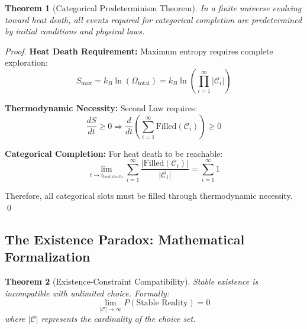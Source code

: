 \documentclass[12pt,a4paper]{article}
\newtheorem{theorem}{Theorem}[section]
\begin{document}
\begin{theorem}[Categorical Predeterminism Theorem]
In a finite universe evolving toward heat death, all events required for categorical completion are predetermined by initial conditions and physical laws.
\end{theorem}

\begin{proof}
\textbf{Heat Death Requirement:}
Maximum entropy requires complete exploration:
\begin{equation}
S_{\text{max}} = k_B \ln(\Omega_{\text{total}}) = k_B \ln\left(\prod_{i=1}^{\infty} |\mathcal{C}_i|\right)
\end{equation}

\textbf{Thermodynamic Necessity:}
Second Law requires:
\begin{equation}
\frac{dS}{dt} \geq 0 \Rightarrow \frac{d}{dt}\left(\sum_{i=1}^{\infty} \text{Filled}(\mathcal{C}_i)\right) \geq 0
\end{equation}

\textbf{Categorical Completion:}
For heat death to be reachable:
\begin{equation}
\lim_{t \to t_{\text{heat death}}} \sum_{i=1}^{\infty} \frac{|\text{Filled}(\mathcal{C}_i)|}{|\mathcal{C}_i|} = \sum_{i=1}^{\infty} 1
\end{equation}

Therefore, all categorical slots must be filled through thermodynamic necessity. \qed
\end{proof}

\subsection{The Existence Paradox: Mathematical Formalization}

\begin{theorem}[Existence-Constraint Compatibility]
Stable existence is incompatible with unlimited choice. Formally:
\begin{equation}
\lim_{|\mathcal{C}| \to \infty} P(\text{Stable Reality}) = 0
\end{equation}
where $|\mathcal{C}|$ represents the cardinality of the choice set.
\end{theorem}
\end{document}
